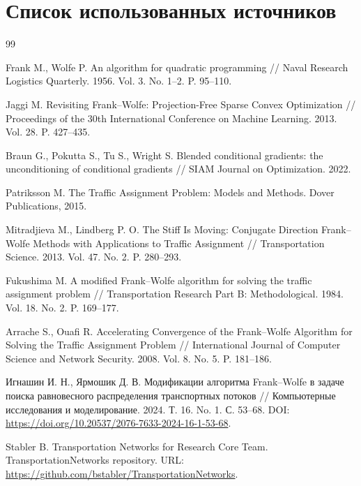\newpage

\setcounter{secnumdepth}{0}
\section{Список использованных источников}
\begingroup
\renewcommand{\section}[2]{}
\begin{thebibliography}{99}

Frank M., Wolfe P. An algorithm for quadratic programming // Naval Research Logistics Quarterly. 1956. Vol. 3. No. 1--2. P. 95--110.

Jaggi M. Revisiting Frank--Wolfe: Projection-Free Sparse Convex Optimization // Proceedings of the 30th International Conference on Machine Learning. 2013. Vol. 28. P. 427--435.

Braun G., Pokutta S., Tu S., Wright S. Blended conditional gradients: the unconditioning of conditional gradients // SIAM Journal on Optimization. 2022.

Patriksson M. The Traffic Assignment Problem: Models and Methods. Dover Publications, 2015.

Mitradjieva M., Lindberg P. O. The Stiff Is Moving: Conjugate Direction Frank--Wolfe Methods with Applications to Traffic Assignment // Transportation Science. 2013. Vol. 47. No. 2. P. 280--293.

Fukushima M. A modified Frank--Wolfe algorithm for solving the traffic assignment problem // Transportation Research Part B: Methodological. 1984. Vol. 18. No. 2. P. 169--177.

Arrache S., Ouafi R. Accelerating Convergence of the Frank--Wolfe Algorithm for Solving the Traffic Assignment Problem // International Journal of Computer Science and Network Security. 2008. Vol. 8. No. 5. P. 181--186.

Игнашин И. Н., Ярмошик Д. В. Модификации алгоритма Frank--Wolfe в задаче поиска равновесного распределения транспортных потоков // Компьютерные исследования и моделирование. 2024. Т. 16. No. 1. С. 53--68. DOI: \url{https://doi.org/10.20537/2076-7633-2024-16-1-53-68}.

Stabler B. Transportation Networks for Research Core Team. TransportationNetworks repository. URL: \url{https://github.com/bstabler/TransportationNetworks}.


\end{thebibliography}
